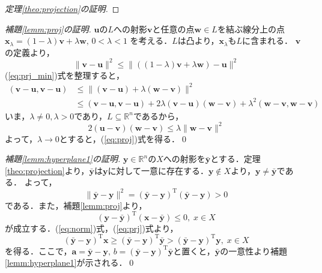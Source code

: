 \documentclass[dvipdfmx]{jsreport}
\begin{document}
\begin{proof}[定理\ref{theo:projection}の証明]

\end{proof}

\begin{proof}[補題\ref{lemm:proj}の証明]
  $\bm{u}$の$L$への射影$\bm{v}$と任意の点$\bm{w} \in L$を結ぶ線分上の点
  $\bm{x}_{\lambda} = (1 - \lambda)\bm{v} + \lambda \bm{w}, \, 0 < \lambda < 1$
  を考える．$L$は凸より，$\bm{x}_{\lambda}$も$L$に含まれる．
  $\bm{v}$の定義より，
  \begin{equation}\label{eq:prj_min}
    \|\bm{v} - \bm{u}\|^2 \leq \|((1 - \lambda)\bm{v} + \lambda \bm{w}) - \bm{u} \|^2
  \end{equation}
  (\ref{eq:prj_min})式を整理すると，
  \begin{align}
    (\bm{v}- \bm{u}, \bm{v}- \bm{u}) &\leq \|(\bm{v} - \bm{u}) + \lambda(\bm{w} - \bm{v}) \|^2 \nonumber \\
    &\leq (\bm{v}- \bm{u}, \bm{v}- \bm{u}) + 2\lambda(\bm{v} - \bm{u})(\bm{w} - \bm{v}) + \lambda^2(\bm{w} - \bm{v}, \bm{w} - \bm{v}) \nonumber
  \end{align}
  いま，$\lambda \neq 0, \lambda > 0$であり，$L \subseteq \mathbb{R}^n$であるから，
  \begin{equation}
    2(\bm{u} - \bm{v})(\bm{w} - \bm{v}) \leq \lambda \|\bm{w} - \bm{v}\|^2 \nonumber
  \end{equation}
  よって，$\lambda \rightarrow 0$とすると，(\ref{eq:proj})式を得る．\qed
\end{proof}

\begin{proof}[補題\ref{lemm:hyperplane1}の証明]
  $\bm{y} \in \mathbb{R}^n$の$X$への射影を$\bar{\bm{y}}$とする．定理\ref{theo:projection}より，$\bar{\bm{y}}$は$\bm{y}$に対して一意に存在する．$\bm{y} \notin X$より，$\bm{y} \neq \bar{\bm{y}}$である．
  よって，
  \begin{equation}\label{eq:norm}
    \|\bar{\bm{y}} - \bm{y}\|^2 = (\bar{\bm{y}} - \bm{y})^{\mathrm{T}}(\bar{\bm{y}} - \bm{y}) > 0
  \end{equation}
  である．また，補題\ref{lemm:proj}より，
  \begin{equation}\label{eq:prj}
    (\bm{y} - \bar{\bm{y}})^{\mathrm{T}}(\bm{x} - \bar{\bm{y}}) \leq 0, \; x \in X
  \end{equation}
  が成立する．(\ref{eq:norm})式，(\ref{eq:prj})式より，
  \begin{equation}
    (\bar{\bm{y}} - \bm{y})^{\mathrm{T}} \bm{x} \geq (\bar{\bm{y}} - \bm{y})^{\mathrm{T}} \bar{\bm{y}} > (\bar{\bm{y}} - \bm{y})^{\mathrm{T}} \bm{y}, \; x \in X \nonumber
  \end{equation}
  を得る．ここで，$\bm{a} = \bar{\bm{y}} - \bm{y}, \, b = (\bar{\bm{y}} - \bm{y})^{\mathrm{T}} \bar{\bm{y}}$と置くと，$\bar{\bm{y}}$の一意性より補題\ref{lemm:hyperplane1}が示される．\qed
\end{proof}
\end{document}
